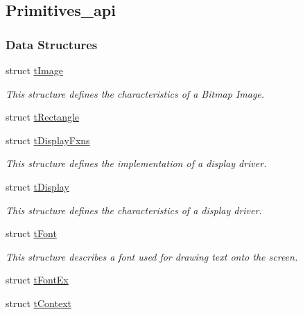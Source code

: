 \subsection{Primitives\+\_\+api}
\label{group__primitives__api}
\subsubsection*{Data Structures}
\begin{DoxyCompactItemize}
\item 
struct \hyperlink{structt_image}{t\+Image}
\begin{DoxyCompactList}\small\item\em This structure defines the characteristics of a Bitmap Image. \end{DoxyCompactList}\item 
struct \hyperlink{structt_rectangle}{t\+Rectangle}
\item 
struct \hyperlink{structt_display_fxns}{t\+Display\+Fxns}
\begin{DoxyCompactList}\small\item\em This structure defines the implementation of a display driver. \end{DoxyCompactList}\item 
struct \hyperlink{structt_display}{t\+Display}
\begin{DoxyCompactList}\small\item\em This structure defines the characteristics of a display driver. \end{DoxyCompactList}\item 
struct \hyperlink{structt_font}{t\+Font}
\begin{DoxyCompactList}\small\item\em This structure describes a font used for drawing text onto the screen. \end{DoxyCompactList}\item 
struct \hyperlink{structt_font_ex}{t\+Font\+Ex}
\item 
struct \hyperlink{structt_context}{t\+Context}
\end{DoxyCompactItemize}
